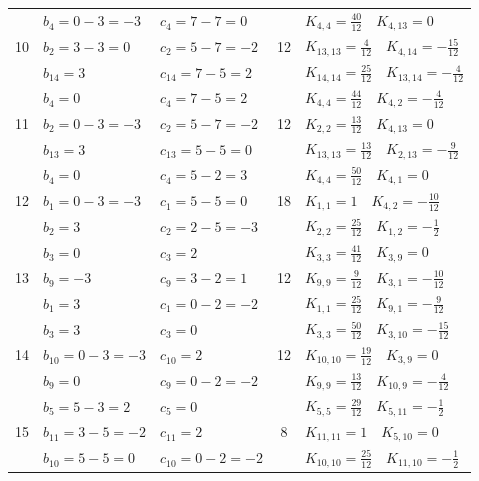 \documentclass[a4paper, 12pt]{article}
\begin{document}
\begin{longtable}{|c|l|l|c|l|}
\multirow{3}{*}{10} & $b_4=0-3=-3$ & $c_4=7-7=0$ & \multirow{3}{*}{12} & $K_{4,4}=\frac{40}{12} \quad K_{4,13} = 0$ \\
 & $b_2=3-3=0$ & $c_2=5-7=-2$ & & $K_{13,13}=\frac{4}{12} \quad K_{4,14}=-\frac{15}{12}$ \\
 & $b_{14}=3$ & $c_{14}=7-5=2$ & & $K_{14,14}=\frac{25}{12} \quad K_{13,14} = -\frac{4}{12}$ \\
\hline

\multirow{3}{*}{11} & $b_4=0$ & $c_4=7-5=2$ & \multirow{3}{*}{12} & $K_{4,4}=\frac{44}{12} \quad K_{4,2} = -\frac{4}{12}$ \\
 & $b_2=0-3=-3$ & $c_2=5-7=-2$ & & $K_{2,2}=\frac{13}{12} \quad K_{4,13}=0$ \\
 & $b_{13}=3$ & $c_{13}=5-5=0$ & & $K_{13,13}=\frac{13}{12} \quad K_{2,13} = -\frac{9}{12}$ \\
\hline

\multirow{3}{*}{12} & $b_4=0$ & $c_4=5-2=3$ & \multirow{3}{*}{18} & $K_{4,4}=\frac{50}{12} \quad K_{4,1}=0$ \\
 & $b_1=0-3=-3$ & $c_1=5-5=0$ & & $K_{1,1}=1 \quad K_{4,2} = -\frac{10}{12}$ \\
 & $b_2=3$ & $c_2=2-5=-3$ & & $K_{2,2}=\frac{25}{12} \quad K_{1,2} = -\frac{1}{2}$ \\
\hline

\multirow{3}{*}{13} & $b_3=0$ & $c_3=2$ & \multirow{3}{*}{12} & $K_{3,3}=\frac{41}{12} \quad K_{3,9}=0$ \\
 & $b_9=-3$ & $c_9=3-2=1$ & & $K_{9,9}=\frac{9}{12} \quad K_{3,1} = -\frac{10}{12}$ \\
 & $b_1=3$ & $c_1=0-2=-2$ & & $K_{1,1}=\frac{25}{12} \quad K_{9,1} = -\frac{9}{12}$ \\
\hline

\multirow{3}{*}{14} & $b_3=3$ & $c_3=0$ & \multirow{3}{*}{12} & $K_{3,3}=\frac{50}{12} \quad K_{3,10} = -\frac{15}{12}$ \\
 & $b_{10}=0-3=-3$ & $c_{10}=2$ & & $K_{10,10}=\frac{19}{12} \quad K_{3,9}=0$ \\
 & $b_9=0$ & $c_9=0-2=-2$ & & $K_{9,9}=\frac{13}{12} \quad K_{10,9} = -\frac{4}{12}$ \\
\hline

\multirow{3}{*}{15} & $b_5=5-3=2$ & $c_5=0$ & \multirow{3}{*}{8} & $K_{5,5}=\frac{29}{12} \quad K_{5,11} = -\frac{1}{2}$ \\
 & $b_{11}=3-5=-2$ & $c_{11}=2$ & & $K_{11,11}=1 \quad K_{5,10}=0$ \\
 & $b_{10}=5-5=0$ & $c_{10}=0-2=-2$ & & $K_{10,10}=\frac{25}{12} \quad K_{11,10} = -\frac{1}{2}$ \\
\hline


\end{longtable}
\end{document}
